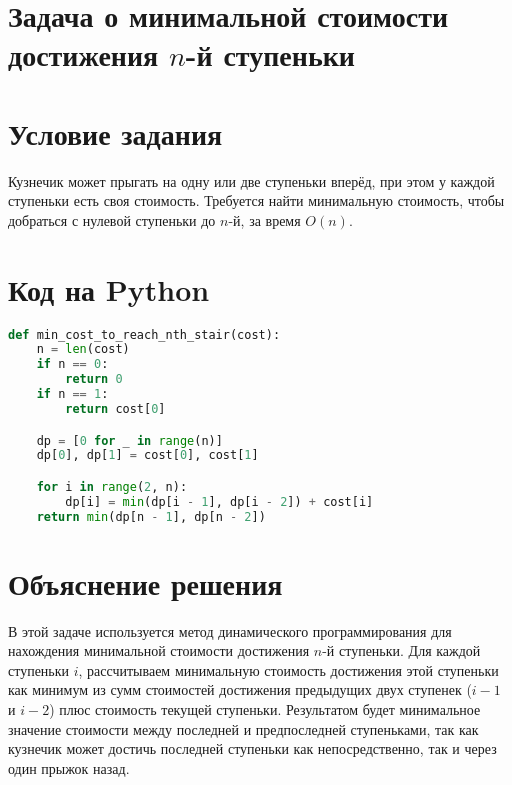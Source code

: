 \section*{Задача о минимальной стоимости достижения \(n\)-й ступеньки}


\section*{Условие задания}

Кузнечик может прыгать на одну или две ступеньки вперёд, при этом у каждой ступеньки есть своя стоимость. Требуется найти минимальную стоимость, чтобы добраться с нулевой ступеньки до \(n\)-й, за время \(O(n)\).

\section*{Код на Python}

\begin{lstlisting}[language=Python]
def min_cost_to_reach_nth_stair(cost):
    n = len(cost)
    if n == 0:
        return 0
    if n == 1:
        return cost[0]

    dp = [0 for _ in range(n)]
    dp[0], dp[1] = cost[0], cost[1]

    for i in range(2, n):
        dp[i] = min(dp[i - 1], dp[i - 2]) + cost[i]
    return min(dp[n - 1], dp[n - 2])
\end{lstlisting}

\section*{Объяснение решения}

В этой задаче используется метод динамического программирования для нахождения минимальной стоимости достижения \(n\)-й ступеньки. Для каждой ступеньки \(i\), рассчитываем минимальную стоимость достижения этой ступеньки как минимум из сумм стоимостей достижения предыдущих двух ступенек (\(i-1\) и \(i-2\)) плюс стоимость текущей ступеньки. Результатом будет минимальное значение стоимости между последней и предпоследней ступеньками, так как кузнечик может достичь последней ступеньки как непосредственно, так и через один прыжок назад.
